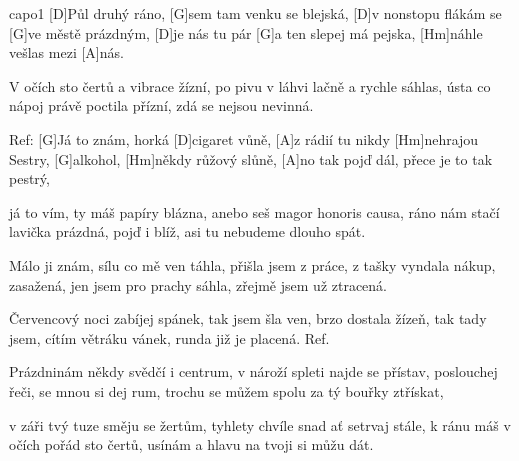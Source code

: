 \hfill capo1
[D]Půl druhý ráno, [G]sem tam venku se blejská,
[D]v nonstopu flákám se [G]ve městě prázdným,
[D]je nás tu pár [G]a ten slepej má pejska,
[Hm]náhle vešlas mezi [A]nás.

V očích sto čertů a vibrace žízní,
po pivu v láhvi lačně a rychle sáhlas,
ústa co nápoj právě poctila přízní,
zdá se nejsou nevinná.

Ref:
[G]Já to znám, horká [D]cigaret vůně,
[A]z rádií tu nikdy [Hm]nehrajou Sestry,
[G]alkohol, [Hm]někdy růžový slůně,
[A]no tak pojď dál, přece je to tak pestrý,

já to vím, ty máš papíry blázna,
anebo seš magor honoris causa,
ráno nám stačí lavička prázdná,
pojď i blíž, asi tu nebudeme dlouho spát.

Málo ji znám, sílu co mě ven táhla,
přišla jsem z práce, z tašky vyndala nákup,
zasažená, jen jsem pro prachy sáhla,
zřejmě jsem už ztracená.

Červencový noci zabíjej spánek,
tak jsem šla ven, brzo dostala žízeň,
tak tady jsem, cítím větráku vánek,
runda již je placená.
\columnbreak
Ref.

Prázdninám někdy svědčí i centrum,
v nároží spleti najde se přístav,
poslouchej řeči, se mnou si dej rum,
trochu se můžem spolu za tý bouřky ztřískat,

v záři tvý tuze směju se žertům,
tyhlety chvíle snad ať setrvaj stále,
k ránu máš v očích pořád sto čertů,
usínám a hlavu na tvoji si můžu dát.
